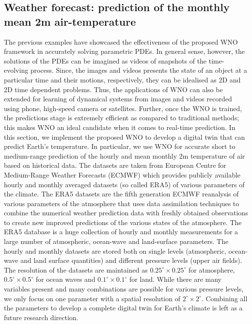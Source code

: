 \documentclass{article}
\begin{document}
\subsection*{Weather forecast: prediction of the monthly mean 2m air-temperature}\label{sec:application}
The previous examples have showcased the effectiveness of the proposed WNO framework in accurately solving parametric PDEs. In general sense, however, the solutions of the PDEs can be imagined as videos of snapshots of the time-evolving process. Since, the images and videos presents the state of an object at a particular time and their motions, respectively, they can be idealised as 2D and 2D time dependent problems. Thus, the applications of WNO can also be extended for learning of dynamical systems from images and videos recorded using phone, high-speed camera or satellites. Further, once the WNO is trained, the predictions stage is extremely efficient as compared to traditional methods; this makes WNO an ideal candidate when it comes to real-time prediction. In this section,
we implement the proposed WNO to develop a digital twin that can predict Earth's temperature. In particular, we use WNO for accurate short to medium-range prediction of the hourly and mean monthly 2m temperature of air based on historical data. The datasets are taken from European Centre for Medium-Range Weather Forecasts (ECMWF) which provides publicly available hourly and monthly averaged datasets (so called ERA5) of various parameters of the climate. The ERA5 datasets are the fifth generation ECMWF reanalysis of various parameters of the atmosphere that uses data assimilation techniques to combine the numerical weather prediction data with freshly obtained observations to create new improved predictions of the various states of the atmosphere. The ERA5 database is a huge collection of hourly and monthly measurements for a large number of atmospheric, ocean-wave and land-surface parameters. The hourly and monthly datasets are stored both on single levels (atmospheric, ocean-wave and land surface quantities) and different pressure levels (upper air fields). The resolution of the datasets are maintained as $0.25^{\circ} \times 0.25^{\circ}$ for atmosphere, $0.5^{\circ} \times 0.5^{\circ}$ for ocean waves and $0.1^{\circ} \times 0.1^{\circ}$ for land. While there are many variables present and many combinations are possible for various pressure levels, we only focus on one parameter with a spatial resolution of $2^{\circ} \times 2^{\circ}$. Combining all the parameters to develop a complete digital twin for Earth's climate is left as a future research direction.
\end{document}

